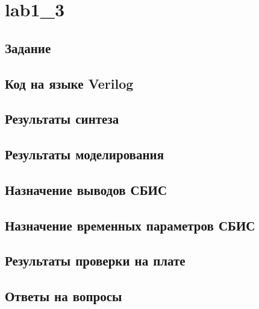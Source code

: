 \section{lab1\_3}

\subsection{Задание}

\subsection{Код на языке Verilog}



\subsection{Результаты синтеза}

\subsection{Результаты моделирования}

\subsection{Назначение выводов СБИС}

\subsection{Назначение временных параметров СБИС}

\subsection{Результаты проверки на плате}

\subsection{Ответы на вопросы}

